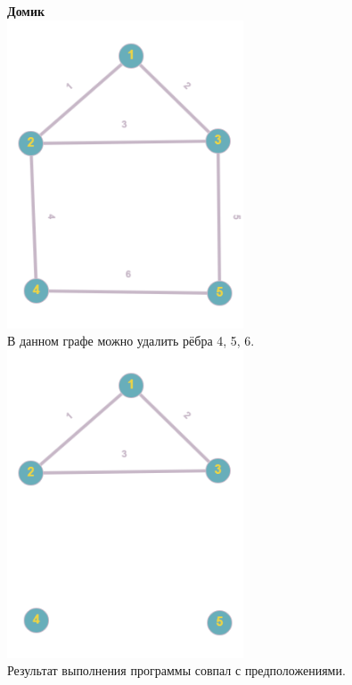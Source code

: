\documentclass[a4paper,14pt]{extarticle}
\begin{document}
\begin{enumerate}[1.]
        \textbf{Домик}\\
        \includegraphics[width=70mm]{testFigureHomeBefore}\\
        В данном графе можно удалить рёбра 4, 5, 6.\\
        \includegraphics[width=70mm]{testFigureHomeAfter}\\
        Результат выполнения программы совпал с предположениями.\\


\end{enumerate}
\end{document}
